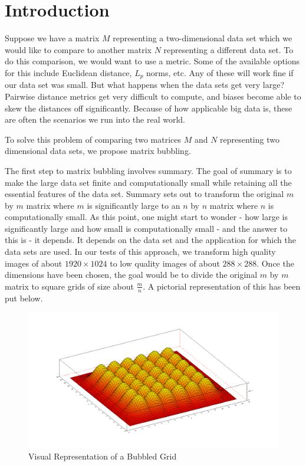 \documentclass{article}
\begin{document}
\section{Introduction}

Suppose we have a matrix $M$ representing a two-dimensional data set which we
would like to compare to another matrix $N$ representing a different data set.
To do this comparison, we would want to use a metric. Some of the available
options for this include Euclidean distance, $L_p$ norms, etc. Any of these
will work fine if our data set was small. But what happens when the data sets
get very large? Pairwise distance metrics get very difficult to compute, and
biases become able to skew the distances off significantly. Because of how
applicable big data is, these are often the scenarios we run into the real
world.

To solve this problem of comparing two matrices $M$ and $N$ representing two
dimensional data sets, we propose matrix bubbling.\cite{gu}

The first step to matrix bubbling involves summary. The goal of summary is to
make the large data set finite and computationally small while retaining all
the essential features of the data set. Summary sets out to transform the
original $m$ by $m$ matrix where $m$ is significantly large to an $n$ by $n$
matrix where $n$ is computationally small. As this point, one might start to
wonder - how large is significantly large and how small is computationally
small - and the answer to this is - it depends. It depends on the data set and
the application for which the data sets are used. In our tests of this
approach, we transform high quality images of about $1920 \times 1024$ to low
quality images of about $288 \times 288$. Once the dimensions have been chosen,
the goal would be to divide the original $m$ by $m$ matrix to square grids of
size about $\frac{m}{n}$. A pictorial representation of this has been put
below.

\begin{figure}[h!]
\begin{center}
\includegraphics[scale=0.16]{matrixbubblesample.png}
\caption{Visual Representation of a Bubbled Grid\cite{bubble}}
\end{center}
\end{figure}
\end{document}
